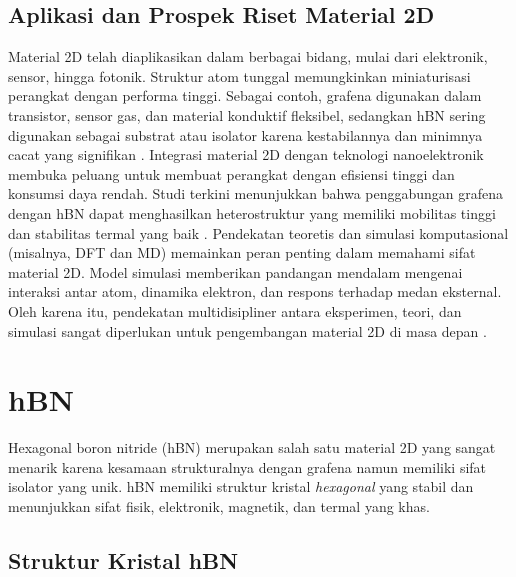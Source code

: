 \subsection{Aplikasi dan Prospek Riset Material 2D}
Material 2D telah diaplikasikan dalam berbagai bidang, mulai dari elektronik, sensor, hingga fotonik.
Struktur atom tunggal memungkinkan miniaturisasi perangkat dengan performa tinggi. Sebagai contoh, grafena digunakan dalam transistor, sensor gas, dan material konduktif fleksibel, sedangkan hBN sering digunakan sebagai substrat atau isolator karena kestabilannya dan minimnya cacat yang signifikan \cite{Geim2013}.
Integrasi material 2D dengan teknologi nanoelektronik membuka peluang untuk membuat perangkat dengan efisiensi tinggi dan konsumsi daya rendah.
Studi terkini menunjukkan bahwa penggabungan grafena dengan hBN dapat menghasilkan heterostruktur yang memiliki mobilitas tinggi dan stabilitas termal yang baik \cite{Wang2017}.
Pendekatan teoretis dan simulasi komputasional (misalnya, DFT dan MD) memainkan peran penting dalam memahami sifat material 2D.
Model simulasi memberikan pandangan mendalam mengenai interaksi antar atom, dinamika elektron, dan respons terhadap medan eksternal.
Oleh karena itu, pendekatan multidisipliner antara eksperimen, teori, dan simulasi sangat diperlukan untuk pengembangan material 2D di masa depan \cite{Das2015}.

\section{hBN}

Hexagonal boron nitride (hBN) merupakan salah satu material 2D yang sangat menarik karena kesamaan strukturalnya dengan grafena namun memiliki sifat isolator yang unik.
hBN memiliki struktur kristal \emph{hexagonal} yang stabil dan menunjukkan sifat fisik, elektronik, magnetik, dan termal yang khas.

\subsection{Struktur Kristal hBN}

